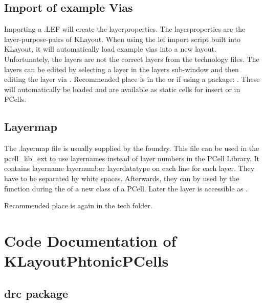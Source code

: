 \documentclass[a4paper,10pt,english]{sphinxmanual}
\begin{document}
\section{Import of example Vias}
\label{\detokenize{techfile:import-of-example-vias}}
Importing a .LEF will create the layerproperties. The layerproperties are the layer-purpose-pairs of KLayout. When using the lef import script built into
KLayout, it will automatically load example vias into a new layout. Unfortunately, the layers are not the correct layers from the technology files.
The layers can be edited by selecting a layer in the layers sub-window and then editing the layer via .
Recommended place is in the  or if using a package: . These will automatically be loaded and are available as static cells for insert or in PCells.


\section{Layermap}
\label{\detokenize{techfile:layermap}}
The .layermap file is usually supplied by the foundry. This file can be used in the pcell\_lib\_ext to use layernames instead of layer numbers in the PCell Library.
It contains layername \textbar{} layernumber \textbar{} layerdatatype on each line for each layer. They have to be separated by white spaces. Afterwards, they can by used by the 
function during the  of a new class of a PCell. Later the layer is accessible as .

Recommended place is again in the tech folder.


\chapter{Code Documentation of KLayoutPhtonicPCells}
\label{\detokenize{modules:code-documentation-of-klayoutphtonicpcells}}\label{\detokenize{modules::doc}}

\section{drc package}
\label{\detokenize{drc:drc-package}}\label{\detokenize{drc::doc}}
\end{document}
